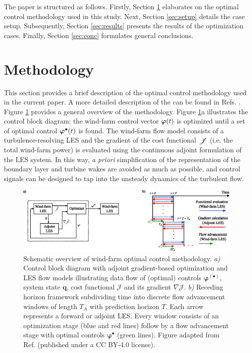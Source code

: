 \documentclass[a4paper]{jpconf}
\begin{document}
The paper is structured as follows. Firstly, Section \ref{sec:meth} elaborates on the optimal control methodology used in this study. Next, Section \ref{sec:setup} details the case setup. Subsequently, Section \ref{sec:results} presents the results of the optimization cases. Finally, Section \ref{sec:conc} formulates general conclusions. 

 \section{Methodology} \label{sec:meth}

This section provides a brief description of the optimal control methodology used in the current paper. A more detailed description of the
can be found in Refs. \cite{goit, munters, muntersenergies}. Figure \ref{fig:meth} provides a general overview of the methodology. Figure
\ref{fig:meth}a illustrates the control block diagram: the wind-farm control vector $\boldsymbol{\varphi}(t)$ is optimized until a set of optimal control
$\boldsymbol{\varphi}^{\bullet}(t)$ is found. The wind-farm flow model consists of a turbulence-resolving LES and the gradient of the 
cost functional $\mathscr{J}$ (i.e. the total wind-farm power) is evaluated using the continuous adjoint formulation of the LES system. In this way,
\emph{a priori} simplification of the representation of the boundary layer and turbine wakes are avoided as much as possible, and control signals can
be designed to tap into the unsteady dynamics of the turbulent flow.

\begin{figure}
	\includegraphics[width=\textwidth]{Torque18/figure1}
	\caption{Schematic overview of wind-farm optimal control methodology. \emph{a)} Control block diagram with adjoint gradient-based optimization
	and LES flow models illustrating data flow of (optimal) controls $\boldsymbol{\varphi}^{(\bullet)}$, system state $\boldsymbol{q}$, cost
	functional $\mathscr{J}$ and its gradient $\nabla \mathscr{J}$. \emph{b)} Receding horizon framework subdividing time into discrete flow
	advancement windows of length $T_A$ with prediction horizon $T$. Each arrow represents a forward or adjoint LES. Every window consists of an
	optimization stage (blue and red lines) follow by a flow advancement stage with optimal controls $\boldsymbol{\varphi}^{\bullet}$ (green
	lines). Figure adapted from Ref. \cite{munterswes} (published under a CC BY-4.0 license). \label{fig:meth} }
\end{figure}
\end{document}
